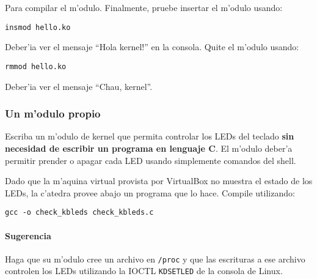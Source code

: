 Para compilar el m'odulo. Finalmente, pruebe insertar el m'odulo usando:

\texttt{insmod hello.ko}

Deber'ia ver el mensaje ``Hola kernel!'' en la consola. Quite el m'odulo usando:

\texttt{rmmod hello.ko}

Deber'ia ver el mensaje ``Chau, kernel''.

\subsubsection{Un m'odulo propio}

Escriba un m'odulo de kernel que permita controlar los LEDs del teclado \textbf{sin necesidad de escribir un programa 
en lenguaje C}. El m'odulo deber'a permitir prender o apagar cada LED usando simplemente comandos del shell.

Dado que la m'aquina virtual provista por VirtualBox no muestra el estado de los LEDs, la c'atedra provee abajo
un programa que lo hace. Compile utilizando:

\texttt{gcc -o check\_kbleds check\_kbleds.c}


\paragraph{Sugerencia}

Haga que su m'odulo cree un archivo en \texttt{/proc} y que las escrituras a ese archivo controlen los LEDs utilizando 
la IOCTL \texttt{KDSETLED} de la consola de Linux.

